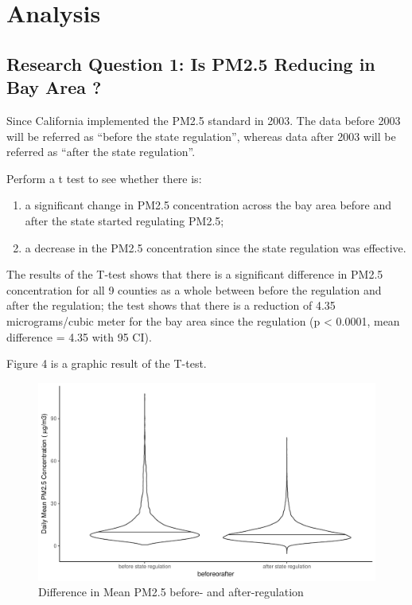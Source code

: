 \documentclass[12pt,]{article}
\begin{document}
\newpage

\section{Analysis}\label{analysis}

\subsection{Research Question 1: Is PM2.5 Reducing in Bay Area
?}\label{research-question-1-is-pm2.5-reducing-in-bay-area}

Since California implemented the PM2.5 standard in 2003. The data before
2003 will be referred as ``before the state regulation'', whereas data
after 2003 will be referred as ``after the state regulation''.

Perform a t test to see whether there is:

\begin{enumerate}
\def\labelenumi{\arabic{enumi})}
\item
  a significant change in PM2.5 concentration across the bay area before
  and after the state started regulating PM2.5;
\item
  a decrease in the PM2.5 concentration since the state regulation was
  effective.
\end{enumerate}

The results of the T-test shows that there is a significant difference
in PM2.5 concentration for all 9 counties as a whole between before the
regulation and after the regulation; the test shows that there is a
reduction of 4.35 micrograms/cubic meter for the bay area since the
regulation (p \textless{} 0.0001, mean difference = 4.35 with 95 CI).

Figure 4 is a graphic result of the T-test.

\begin{figure}
\centering
\includegraphics{pm25_files/figure-latex/unnamed-chunk-3-1.pdf}
\caption{Difference in Mean PM2.5 before- and after-regulation}
\end{figure}
\end{document}
